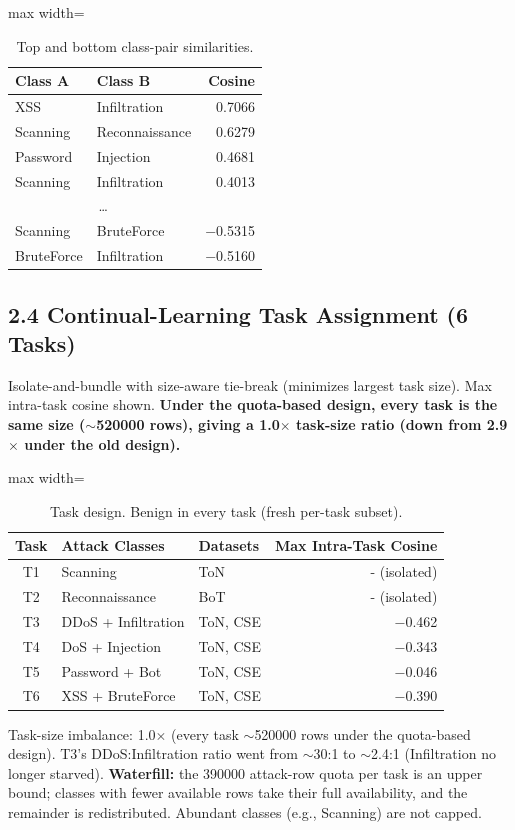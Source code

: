 \documentclass[11pt,a4paper]{article}
\begin{document}
\begin{table}[H]
\centering
\caption{Top and bottom class-pair similarities.}
\label{tab:similarity-pairs}
\begin{adjustbox}{max width=\textwidth}
\begin{tabular}{llr}
\toprule
Class A & Class B & Cosine \\
\midrule
XSS & Infiltration & \num{0.7066} \\
Scanning & Reconnaissance & \num{0.6279} \\
Password & Injection & \num{0.4681} \\
Scanning & Infiltration & \num{0.4013} \\
\multicolumn{2}{c}{\dots} & \\
Scanning & BruteForce & \num{-0.5315} \\
BruteForce & Infiltration & \num{-0.5160} \\
\bottomrule
\end{tabular}
\end{adjustbox}
\end{table}

\subsection*{2.4 Continual-Learning Task Assignment (6 Tasks)}
Isolate-and-bundle with size-aware tie-break (minimizes largest task size). Max intra-task cosine shown. \textbf{Under the quota-based design, every task is the same size ($\sim$\num{520000} rows), giving a 1.0$\times$ task-size ratio (down from 2.9$\times$ under the old design).}

\begin{table}[H]
\centering
\caption{Task design. Benign in every task (fresh per-task subset).}
\label{tab:task-design}
\begin{adjustbox}{max width=\textwidth}
\begin{tabular}{cllr}
\toprule
Task & Attack Classes & Datasets & Max Intra-Task Cosine \\
\midrule
T1 & Scanning & ToN & - (isolated) \\
T2 & Reconnaissance & BoT & - (isolated) \\
T3 & DDoS + Infiltration & ToN, CSE & \num{-0.462} \\
T4 & DoS + Injection & ToN, CSE & \num{-0.343} \\
T5 & Password + Bot & ToN, CSE & \num{-0.046} \\
T6 & XSS + BruteForce & ToN, CSE & \num{-0.390} \\
\bottomrule
\end{tabular}
\end{adjustbox}
\end{table}
Task-size imbalance: \num{1.0}$\times$ (every task $\sim$\num{520000} rows under the quota-based design). T3's DDoS:Infiltration ratio went from $\sim$30:1 to $\sim$2.4:1 (Infiltration no longer starved). \textbf{Waterfill:} the \num{390000} attack-row quota per task is an upper bound; classes with fewer available rows take their full availability, and the remainder is redistributed. Abundant classes (e.g., Scanning) are not capped.
\end{document}
